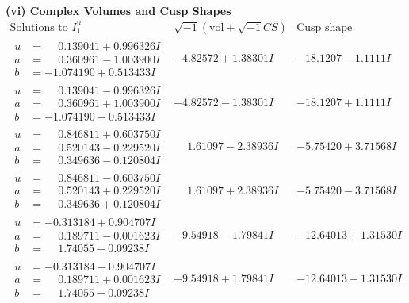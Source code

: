 \documentclass[1p]{elsarticle_modified}
\theoremstyle{definition}
\newcommand{\I}{\sqrt{-1}}
\begin{document}
\newpage\flushleft \textbf{(vi) Complex Volumes and Cusp Shapes}
$$\begin{array}{c|c|c}  
\text{Solutions to }I^u_{1}& \I (\text{vol} + \sqrt{-1}CS) & \text{Cusp shape}\\
 \hline 
\begin{aligned}
u &= \phantom{-}0.139041 + 0.996326 I \\
a &= \phantom{-}0.360961 - 1.003900 I \\
b &= -1.074190 + 0.513433 I\end{aligned}
 & -4.82572 + 1.38301 I & -18.1207 - 1.1111 I \\ \hline\begin{aligned}
u &= \phantom{-}0.139041 - 0.996326 I \\
a &= \phantom{-}0.360961 + 1.003900 I \\
b &= -1.074190 - 0.513433 I\end{aligned}
 & -4.82572 - 1.38301 I & -18.1207 + 1.1111 I \\ \hline\begin{aligned}
u &= \phantom{-}0.846811 + 0.603750 I \\
a &= \phantom{-}0.520143 - 0.229520 I \\
b &= \phantom{-}0.349636 - 0.120804 I\end{aligned}
 & \phantom{-}1.61097 - 2.38936 I & -5.75420 + 3.71568 I \\ \hline\begin{aligned}
u &= \phantom{-}0.846811 - 0.603750 I \\
a &= \phantom{-}0.520143 + 0.229520 I \\
b &= \phantom{-}0.349636 + 0.120804 I\end{aligned}
 & \phantom{-}1.61097 + 2.38936 I & -5.75420 - 3.71568 I \\ \hline\begin{aligned}
u &= -0.313184 + 0.904707 I \\
a &= \phantom{-}0.189711 - 0.001623 I \\
b &= \phantom{-}1.74055 + 0.09238 I\end{aligned}
 & -9.54918 - 1.79841 I & -12.64013 + 1.31530 I \\ \hline\begin{aligned}
u &= -0.313184 - 0.904707 I \\
a &= \phantom{-}0.189711 + 0.001623 I \\
b &= \phantom{-}1.74055 - 0.09238 I\end{aligned}
 & -9.54918 + 1.79841 I & -12.64013 - 1.31530 I \\ \hline\begin{aligned}

\end{aligned}
\end{array}$$
\end{document}
